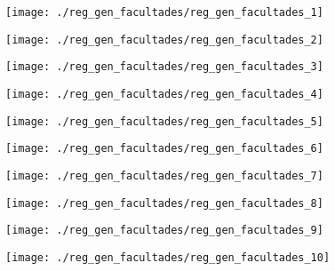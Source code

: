 \begin{figure}[!ht]
    \centering
    \texttt{[image: ./reg\_gen\_facultades/reg\_gen\_facultades\_1]}
\end{figure}
\clearpage

\begin{figure}[!ht]
    \centering
    \texttt{[image: ./reg\_gen\_facultades/reg\_gen\_facultades\_2]}
\end{figure}
\clearpage

\begin{figure}[!ht]
    \centering
    \texttt{[image: ./reg\_gen\_facultades/reg\_gen\_facultades\_3]}
\end{figure}
\clearpage

\begin{figure}[!ht]
    \centering
    \texttt{[image: ./reg\_gen\_facultades/reg\_gen\_facultades\_4]}
\end{figure}
\clearpage

\begin{figure}[!ht]
    \centering
    \texttt{[image: ./reg\_gen\_facultades/reg\_gen\_facultades\_5]}
\end{figure}
\clearpage

\begin{figure}[!ht]
    \centering
    \texttt{[image: ./reg\_gen\_facultades/reg\_gen\_facultades\_6]}
\end{figure}
\clearpage

\begin{figure}[!ht]
    \centering
    \texttt{[image: ./reg\_gen\_facultades/reg\_gen\_facultades\_7]}
\end{figure}
\clearpage

\begin{figure}[!ht]
    \centering
    \texttt{[image: ./reg\_gen\_facultades/reg\_gen\_facultades\_8]}
\end{figure}
\clearpage

\begin{figure}[!ht]
    \centering
    \texttt{[image: ./reg\_gen\_facultades/reg\_gen\_facultades\_9]}
\end{figure}
\clearpage

\begin{figure}[!ht]
    \centering
    \texttt{[image: ./reg\_gen\_facultades/reg\_gen\_facultades\_10]}
\end{figure}
\clearpage

